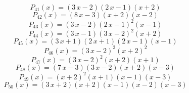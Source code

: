 \subitem \begin{dmath*}P_{41}(x) = {\left(3 \, x - 2\right)} {\left(2 \, x - 1\right)} {\left(x + 2\right)} \end{dmath*}\vspace{- 1.20000000000000 cm}
\subitem \begin{dmath*}P_{42}(x) = {\left(8 \, x - 3\right)} {\left(x + 2\right)} {\left(x - 2\right)} \end{dmath*}\vspace{- 1.20000000000000 cm}
\subitem \begin{dmath*}P_{43}(x) = {\left(3 \, x - 2\right)} {\left(2 \, x - 1\right)}^{2} {\left(x - 1\right)} \end{dmath*}\vspace{- 1.20000000000000 cm}
\subitem \begin{dmath*}P_{44}(x) = {\left(3 \, x - 1\right)} {\left(3 \, x - 2\right)}^{2} {\left(x + 2\right)} \end{dmath*}\vspace{- 1.20000000000000 cm}
\subitem \begin{dmath*}P_{45}(x) = {\left(3 \, x + 1\right)} {\left(2 \, x + 1\right)} {\left(2 \, x - 1\right)} {\left(x - 1\right)} \end{dmath*}\vspace{- 1.20000000000000 cm}
\subitem \begin{dmath*}P_{46}(x) = {\left(3 \, x - 2\right)}^{2} {\left(x + 2\right)}^{2} \end{dmath*}\vspace{- 1.20000000000000 cm}
\subitem \begin{dmath*}P_{47}(x) = {\left(3 \, x - 2\right)}^{2} {\left(x + 2\right)} {\left(x + 1\right)} \end{dmath*}\vspace{- 1.20000000000000 cm}
\subitem \begin{dmath*}P_{48}(x) = {\left(7 \, x - 3\right)} {\left(3 \, x - 2\right)} {\left(x + 2\right)} {\left(x - 3\right)} \end{dmath*}\vspace{- 1.20000000000000 cm}
\subitem \begin{dmath*}P_{49}(x) = {\left(x + 2\right)}^{2} {\left(x + 1\right)} {\left(x - 1\right)} {\left(x - 3\right)} \end{dmath*}\vspace{- 1.20000000000000 cm}
\subitem \begin{dmath*}P_{50}(x) = {\left(3 \, x + 2\right)} {\left(x + 2\right)} {\left(x - 1\right)} {\left(x - 2\right)} {\left(x - 3\right)} \end{dmath*}\vspace{- 1.20000000000000 cm}

